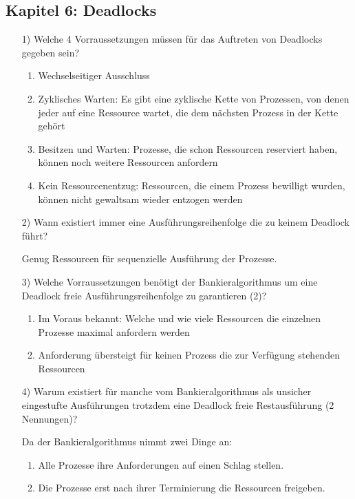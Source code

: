 \documentclass[11pt,a4paper]{article}
\begin{document}
\subsection*{Kapitel 6: Deadlocks}
\begin{itemize}
\item[1)] Welche 4 Vorraussetzungen müssen für das Auftreten von Deadlocks gegeben sein?

\begin{enumerate}
\item Wechselseitiger Ausschluss
\item Zyklisches Warten: Es gibt eine zyklische Kette von Prozessen, von denen jeder auf eine Ressource wartet, die dem nächsten Prozess in der Kette gehört
\item Besitzen und Warten: Prozesse, die schon Ressourcen reserviert haben, können noch weitere Ressourcen anfordern
\item Kein Ressourcenentzug: Ressourcen, die einem Prozess bewilligt wurden, können nicht gewaltsam wieder entzogen werden
\end{enumerate}


\item[2)] Wann existiert immer eine Ausführungsreihenfolge die zu keinem Deadlock führt?

Genug Ressourcen für sequenzielle Ausführung der Prozesse.

\item[3)] Welche Vorraussetzungen benötigt der Bankieralgorithmus um eine Deadlock freie Ausführungsreihenfolge zu garantieren (2)?

\begin{enumerate}
\item Im Voraus bekannt: Welche und wie viele Ressourcen die einzelnen Prozesse maximal anfordern werden
\item Anforderung übersteigt für keinen Prozess die zur Verfügung stehenden Ressourcen
\end{enumerate}

\item[4)] Warum existiert für manche vom Bankieralgorithmus als unsicher eingestufte Ausführungen trotzdem eine Deadlock freie Restausführung (2 Nennungen)?

Da der Bankieralgorithmus nimmt zwei Dinge an:
\begin{enumerate}
\item Alle Prozesse ihre Anforderungen auf einen Schlag stellen.
\item Die Prozesse erst nach ihrer Terminierung die Ressourcen freigeben. 
\end{enumerate}


\end{itemize}
\end{document}
